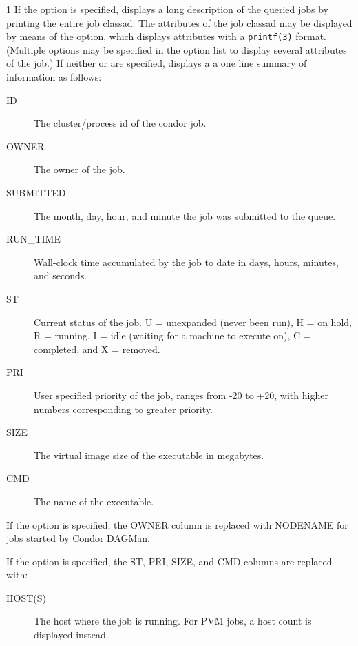 \begin{ManPage}{\label{man-condor-q}}{1}
If the  option is specified,  displays a long description 
of the queried jobs by printing the entire job classad.
The attributes of the job classad may be displayed by means of the
 option, which displays attributes with a \verb+printf(3)+
format.
(Multiple  options may be specified in the option list to display
several attributes of the job.)
If neither  or  are specified,  displays a 
a one line summary of information as follows:

\begin{description}
\item[ID] The cluster/process id of the condor job. 
\item[OWNER] The owner of the job. 
\item[SUBMITTED] The month, day, hour, and minute the job was submitted to the 
	queue. 
\item[RUN\_TIME]  Wall-clock time accumulated by the job to date in days, 
	hours, minutes, and seconds.  
\item[ST] Current status of the job. U = unexpanded (never been run), H = on hold,
	R = running, I = idle (waiting for a machine to execute on), C = completed, 
	and X = removed. 
\item[PRI] User specified priority of the job, ranges from -20 to +20, with 
	higher numbers corresponding to greater priority. 
\item[SIZE] The virtual image size of the executable in megabytes. 
\item[CMD] The name of the executable. 
\end{description}

If the  option is specified, the OWNER column is replaced
with NODENAME for jobs started by Condor DAGMan.


If the  option is specified, the ST, PRI, SIZE, and CMD
columns are replaced with:

\begin{description}
\item[HOST(S)] The host where the job is running.  For PVM jobs, a
host count is displayed instead.
\end{description}


\end{ManPage}
